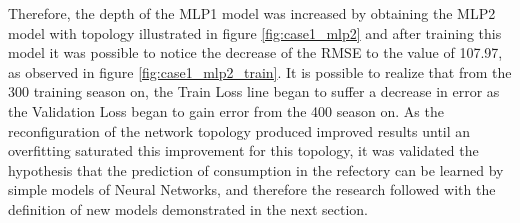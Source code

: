         Therefore, the depth of the MLP1 model was increased by obtaining the MLP2 model with topology illustrated in figure \ref{fig:case1_mlp2} and after training this model it was possible to notice the decrease of the RMSE to the value of 107.97, as observed in figure \ref{fig:case1_mlp2_train}. It is possible to realize that from the 300 training season on, the Train Loss line began to suffer a decrease in error as the Validation Loss began to gain error from the 400 season on. As the reconfiguration of the network topology produced improved results until an overfitting saturated this improvement for this topology, it was validated the hypothesis that the prediction of consumption in the refectory can be learned by simple models of Neural Networks, and therefore the research followed with the definition of new models demonstrated in the next section.
        \begin{figure}[H]
        \end{figure}
